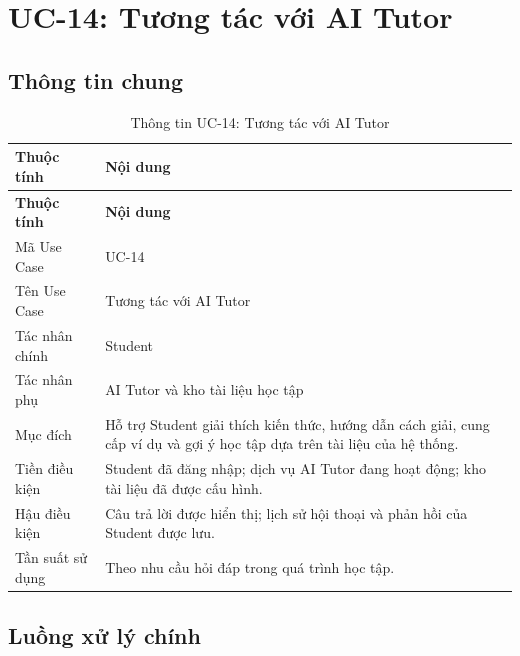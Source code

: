 \section{UC-14: Tương tác với AI Tutor}
\label{sec:uc14-ai-tutor}

\subsection{Thông tin chung}

\begin{longtable}{|p{4.2cm}|p{10.2cm}|}
	\caption{Thông tin UC-14: Tương tác với AI Tutor}
	\label{tab:uc14-info}\\
	\hline
	\textbf{Thuộc tính} & \textbf{Nội dung} \\
	\hline
	\endfirsthead
	
	\hline
	\textbf{Thuộc tính} & \textbf{Nội dung} \\
	\hline
	\endhead
	
	Mã Use Case &
	UC-14 \\
	\hline
	
	Tên Use Case &
	Tương tác với AI Tutor \\
	\hline
	
	Tác nhân chính &
	Student \\
	\hline
	
	Tác nhân phụ &
	AI Tutor và kho tài liệu học tập \\
	\hline
	
	Mục đích &
	Hỗ trợ Student giải thích kiến thức, hướng dẫn cách giải, cung cấp ví dụ
	và gợi ý học tập dựa trên tài liệu của hệ thống. \\
	\hline
	
	Tiền điều kiện &
	Student đã đăng nhập; dịch vụ AI Tutor đang hoạt động; kho tài liệu đã
	được cấu hình. \\
	\hline
	
	Hậu điều kiện &
	Câu trả lời được hiển thị; lịch sử hội thoại và phản hồi của Student
	được lưu. \\
	\hline
	
	Tần suất sử dụng &
	Theo nhu cầu hỏi đáp trong quá trình học tập. \\
	\hline
	
\end{longtable}

\subsection{Luồng xử lý chính}

